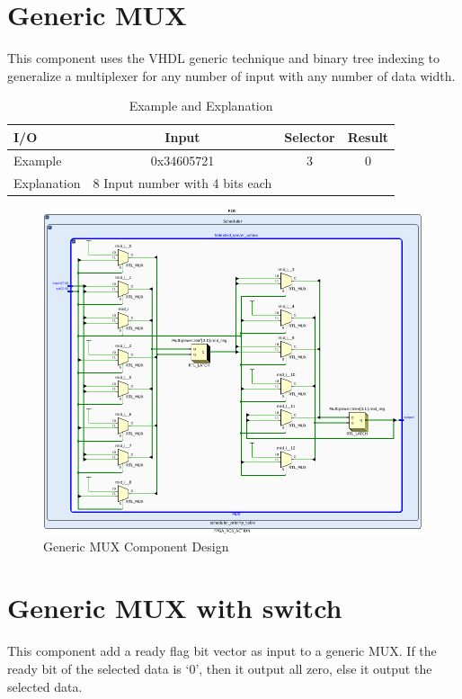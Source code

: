 \section{Generic MUX}

	This component uses the VHDL generic technique and binary tree indexing to generalize a multiplexer for any number of input with any number of data width.
	
 \begin{table}[htb]
	\centering
	\caption{Example and Explanation }
	\begin{tabular}{l c c c}
		\toprule
		I/O  &  Input  & Selector & Result \\ \midrule
		Example  &  0x34605721 & 3 & 0\\
		Explanation  & 8 Input number with 4 bits each \\
		\bottomrule
	\end{tabular}
	\label{tab:tab-mux}
\end{table}	
	
\begin{figure}[htb]
	\centering
	\includegraphics[width=.8\linewidth]{figures/mux.png}
	\caption{Generic MUX Component Design}
	\label{fig:mux}
\end{figure}
 
\section{Generic MUX with switch}

	This component add a ready flag bit vector as input to a generic MUX. If the ready bit of the selected data is ‘0’, then it output all zero, else it output the selected data.
	

